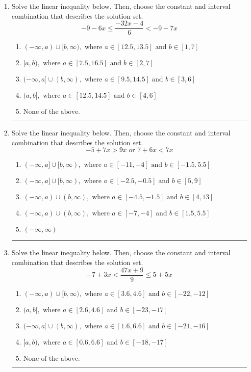 \documentclass[14pt]{extbook}
\newcommand{\litem}[1]{\item#1\hspace*{-1cm}\rule{\textwidth}{0.4pt}}
\begin{document}
\begin{enumerate}
\litem{
Solve the linear inequality below. Then, choose the constant and interval combination that describes the solution set.\[ -9 - 6 x \leq \frac{-32 x - 4}{6} < -9 - 7 x \]\begin{enumerate}[label=\Alph*.]
\item \( (-\infty, a) \cup [b, \infty), \text{ where } a \in [12.5, 13.5] \text{ and } b \in [1, 7] \)
\item \( [a, b), \text{ where } a \in [7.5, 16.5] \text{ and } b \in [2, 7] \)
\item \( (-\infty, a] \cup (b, \infty), \text{ where } a \in [9.5, 14.5] \text{ and } b \in [3, 6] \)
\item \( (a, b], \text{ where } a \in [12.5, 14.5] \text{ and } b \in [4, 6] \)
\item \( \text{None of the above.} \)

\end{enumerate} }
\litem{
Solve the linear inequality below. Then, choose the constant and interval combination that describes the solution set.\[ -5 + 7 x > 9 x \text{ or } 7 + 6 x < 7 x \]\begin{enumerate}[label=\Alph*.]
\item \( (-\infty, a] \cup [b, \infty), \text{ where } a \in [-11, -4] \text{ and } b \in [-1.5, 5.5] \)
\item \( (-\infty, a] \cup [b, \infty), \text{ where } a \in [-2.5, -0.5] \text{ and } b \in [5, 9] \)
\item \( (-\infty, a) \cup (b, \infty), \text{ where } a \in [-4.5, -1.5] \text{ and } b \in [4, 13] \)
\item \( (-\infty, a) \cup (b, \infty), \text{ where } a \in [-7, -4] \text{ and } b \in [1.5, 5.5] \)
\item \( (-\infty, \infty) \)

\end{enumerate} }
\litem{
Solve the linear inequality below. Then, choose the constant and interval combination that describes the solution set.\[ -7 + 3 x < \frac{47 x + 9}{9} \leq 5 + 5 x \]\begin{enumerate}[label=\Alph*.]
\item \( (-\infty, a) \cup [b, \infty), \text{ where } a \in [3.6, 4.6] \text{ and } b \in [-22, -12] \)
\item \( (a, b], \text{ where } a \in [2.6, 4.6] \text{ and } b \in [-23, -17] \)
\item \( (-\infty, a] \cup (b, \infty), \text{ where } a \in [1.6, 6.6] \text{ and } b \in [-21, -16] \)
\item \( [a, b), \text{ where } a \in [0.6, 6.6] \text{ and } b \in [-18, -17] \)
\item \( \text{None of the above.} \)


\end{enumerate}}
\end{enumerate}
\end{document}
